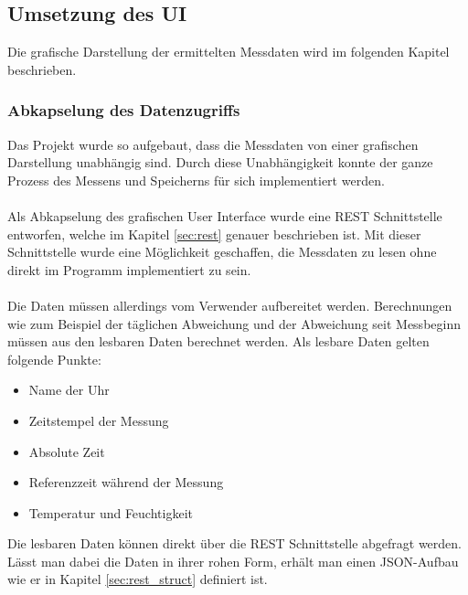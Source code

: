 \subsection{Umsetzung des UI} 
Die grafische Darstellung der ermittelten Messdaten wird im folgenden Kapitel beschrieben.

\subsubsection{Abkapselung des Datenzugriffs}
Das Projekt wurde so aufgebaut, dass die Messdaten von einer grafischen Darstellung unabhängig sind.
Durch diese Unabhängigkeit konnte der ganze Prozess des Messens und Speicherns für sich implementiert werden.\\
\\
Als Abkapselung des grafischen User Interface wurde eine REST Schnittstelle entworfen, welche im Kapitel \ref{sec:rest} genauer beschrieben ist.
Mit dieser Schnittstelle wurde eine Möglichkeit geschaffen, die Messdaten zu lesen ohne direkt im Programm implementiert zu sein.\\
\\
Die Daten müssen allerdings vom Verwender aufbereitet werden.
Berechnungen wie zum Beispiel der täglichen Abweichung und der Abweichung seit Messbeginn müssen aus den lesbaren Daten berechnet werden.
Als lesbare Daten gelten folgende Punkte:
\begin{itemize}
    \item Name der Uhr
    \item Zeitstempel der Messung
    \item Absolute Zeit
    \item Referenzzeit während der Messung
    \item Temperatur und Feuchtigkeit
\end{itemize}
Die lesbaren Daten können direkt über die REST Schnittstelle abgefragt werden.
Lässt man dabei die Daten in ihrer rohen Form, erhält man einen JSON-Aufbau wie er in Kapitel \ref{sec:rest_struct} definiert ist.

\clearpage
